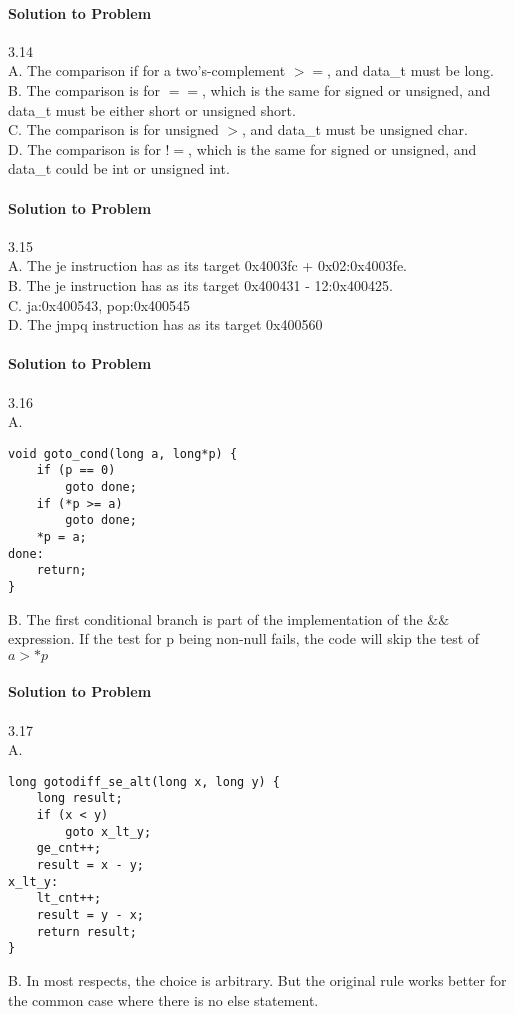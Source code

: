 \documentclass{report}
\begin{document}
\paragraph{Solution to Problem } 3.14 \\
A. The comparison if for a two's-complement $>=$, and data\_t must be long. \\
B. The comparison is for $==$, which is the same for signed or unsigned, and data\_t must be either short or unsigned short. \\
C. The comparison is for unsigned $>$, and data\_t must be unsigned char. \\
D. The comparison is for $!=$, which is the same for signed or unsigned, and data\_t could be int or unsigned int.

\paragraph{Solution to Problem } 3.15 \\
A. The je instruction has as its target 0x4003fc + 0x02:0x4003fe. \\
B. The je instruction has as its target 0x400431 - 12:0x400425. \\
C. ja:0x400543, pop:0x400545 \\
D. The jmpq instruction has as its target 0x400560

\paragraph{Solution to Problem } 3.16 \\
A. 
\begin{lstlisting}
void goto_cond(long a, long*p) {
    if (p == 0)
        goto done;
    if (*p >= a) 
        goto done;
    *p = a;
done:
    return;
}
\end{lstlisting}
B. The first conditional branch is part of the implementation of the $\&\&$ expression. If the test for p being non-null fails, the code will skip the test of $a > *p$

\paragraph{Solution to Problem } 3.17 \\
A.
\begin{lstlisting}
long gotodiff_se_alt(long x, long y) {
    long result;
    if (x < y) 
        goto x_lt_y;
    ge_cnt++;
    result = x - y;
x_lt_y:
    lt_cnt++;
    result = y - x;
    return result;
}
\end{lstlisting} 
B. In most respects, the choice is arbitrary. But the original rule works better for the common case where there is no else statement.
\end{document}
